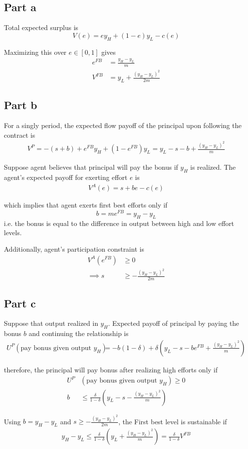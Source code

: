 \subsection*{Part a}

Total expected surplus is
$$ V(e) = ey_H + (1-e)y_L - c(e)$$

Maximizing this over $e\in [0,1]$ gives
\begin{align*}
    e^{FB} &= \frac{y_H - y_L}{m}\\
    V^{FB} &= y_L + \frac{(y_H - y_L)^2}{2m}
\end{align*}

\subsection*{Part b}
For a singly period, the expected flow payoff of the principal upon following the contract is 
\begin{align*}
    V^P = -(s+b) + e^{FB}y_H + (1-e^{FB})y_L = y_L - s - b + \frac{(y_H - y_L)^2}{m}
\end{align*}


Suppose agent believes that principal will pay the bonus if $y_H$ is realized. The agent's expected payoff for exerting effort $e$ is
\begin{align*}
    V^A(e) = s + be - c(e)
\end{align*}

which implies that agent exerts first best efforts only if
$$ b = me^{FB} = y_H - y_L$$
i.e. the bonus is equal to the difference in output between high and low effort levels.

Additionally, agent's participation constraint is 
\begin{align*}
    V^A(e^{FB}) &\ge 0\\
    \implies s &\ge - \frac{(y_H - y_L)^2}{2m} 
\end{align*}

\subsection*{Part c}

Suppose that output realized in $y_H$. Expected payoff of principal by paying the bonus $b$ and continuing the relationship is 
\begin{align*}
    U^P(\text{pay bonus given output $y_H$}) &= -b(1-\delta) + \delta\left( y_L - s - be^{FB} + \frac{(y_H - y_L)^2}{m} \right)
\end{align*}

therefore, the principal will pay bonus after realizing high efforts only if
\begin{align*}
    U^P&(\text{pay bonus given output $y_H$}) \ge 0 \\
    b &\le \frac{\delta}{1-\delta}\left( y_L - s - \frac{(y_H - y_L)^2}{m} \right)
\end{align*}

Using $b = y_H - y_L$ and $s\ge - \frac{(y_H - y_L)^2}{2m} $, the First best level is sustainable if 
\begin{align*}
    y_H - y_L \le \frac{\delta}{1-\delta}\left( y_L  + \frac{(y_H - y_L)^2}{m} \right) = \frac{\delta}{1-\delta}V^{FB}
\end{align*}